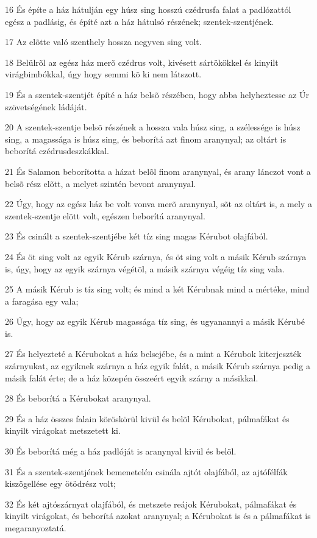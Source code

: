 \par 16 És építe a ház hátulján egy húsz sing hosszú czédrusfa falat a padlózattól egész a padlásig, és építé azt a ház hátulsó részének; szentek-szentjének.
\par 17 Az elõtte való szenthely hossza negyven sing volt.
\par 18 Belülrõl az egész ház merõ czédrus volt, kivésett sártökökkel és kinyilt virágbimbókkal, úgy hogy semmi kõ ki nem látszott.
\par 19 És a szentek-szentjét építé a ház belsõ részében, hogy abba helyheztesse az Úr szövetségének ládáját.
\par 20 A szentek-szentje belsõ részének a hossza vala húsz sing, a szélessége is húsz sing, a magassága is húsz sing, és beborítá azt finom aranynyal; az oltárt is beborítá czédrusdeszkákkal.
\par 21 És Salamon beborította a házat belõl finom aranynyal, és arany lánczot vont a belsõ rész elõtt, a melyet szintén bevont aranynyal.
\par 22 Úgy, hogy az egész ház be volt vonva merõ aranynyal, sõt az oltárt is, a mely a szentek-szentje elõtt volt, egészen beborítá aranynyal.
\par 23 És csinált a szentek-szentjébe két tíz sing magas Kérubot olajfából.
\par 24 És öt sing volt az egyik Kérub szárnya, és öt sing volt a másik Kérub szárnya is, úgy, hogy az egyik szárnya végétõl, a másik szárnya végéig tíz sing vala.
\par 25 A másik Kérub is tíz sing volt; és mind a két Kérubnak mind a mértéke, mind a faragása egy vala;
\par 26 Úgy, hogy az egyik Kérub magassága tíz sing, és ugyanannyi a másik Kérubé is.
\par 27 És helyezteté a Kérubokat a ház belsejébe, és a mint a Kérubok kiterjeszték szárnyukat, az egyiknek szárnya a ház egyik falát, a másik Kérub szárnya pedig a másik falát érte; de a ház közepén összeért egyik szárny a másikkal.
\par 28 És beborítá a Kérubokat aranynyal.
\par 29 És a ház összes falain köröskörül kivül és belõl Kérubokat, pálmafákat és kinyilt virágokat metszetett ki.
\par 30 És beborítá még a ház padlóját is aranynyal kivül és belõl.
\par 31 És a szentek-szentjének bemenetelén csinála ajtót olajfából, az ajtófélfák kiszögellése egy ötödrész volt;
\par 32 És két ajtószárnyat olajfából, és metszete reájok Kérubokat, pálmafákat és kinyilt virágokat, és beborítá azokat aranynyal; a Kérubokat is és a pálmafákat is megaranyoztatá.

